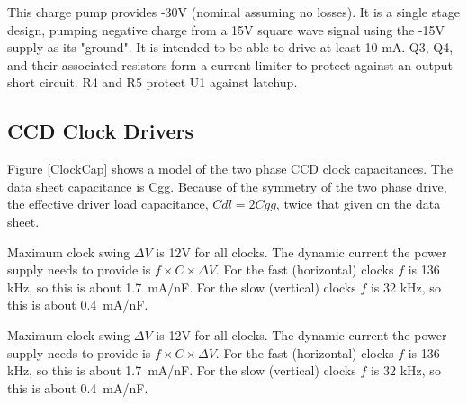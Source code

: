\documentclass[a4paper,12pt]{article}
\begin{document}
This charge pump provides -30V (nominal assuming no losses). It is a single stage design, pumping negative charge from a 15V square wave signal using the -15V supply as its "ground". It is intended to be able to drive at least 10 mA. Q3, Q4, and their associated resistors form a current limiter to protect against an output short circuit. R4 and R5 protect U1 against latchup.






\pagebreak
\subsection{CCD Clock Drivers}
\label{ClockDrivers}
Figure \ref{ClockCap} shows a model of the two phase CCD clock capacitances. The data sheet capacitance is Cgg.  Because of the symmetry of the two phase drive, the effective driver load capacitance, $Cdl=2Cgg$, twice that given on the data sheet.

Maximum clock swing $\Delta V$ is 12V for all clocks. The dynamic current the power supply needs to provide is $f\times C \times \Delta V$. For the fast (horizontal) clocks $f$ is 136 kHz, so this is about 1.7\ mA/nF. For the slow (vertical) clocks $f$ is 32 kHz, so this is about 0.4\ mA/nF.

Maximum clock swing $\Delta V$ is 12V for all clocks. The dynamic current the power supply needs to provide is $f\times C \times \Delta V$. For the fast (horizontal) clocks $f$ is 136 kHz, so this is about 1.7\ mA/nF. For the slow (vertical) clocks $f$ is 32 kHz, so this is about 0.4\ mA/nF.
\end{document}
